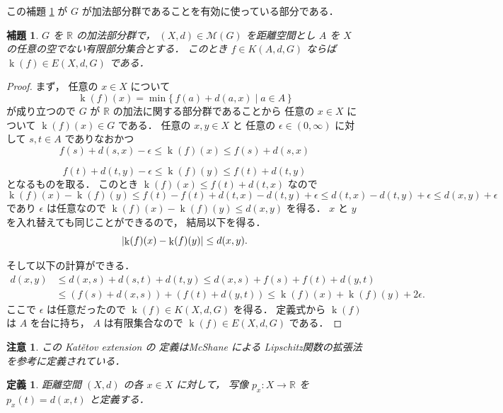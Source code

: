 \documentclass[leqno, 12pt]{jsarticle}
\newtheorem{lem}[thm]{補題}
\newtheorem{df}[thm]{定義}
\newtheorem*{rmk}{注意}
\newcommand{\rr}{\mathbb{R}}
\DeclareMathOperator{\kat}{k}
\newcommand{\KatExt}[1]{\kat(#1)}
\DeclarePairedDelimiter{\abs}{\lvert}{\rvert}
\newcommand{\Met}[1]{\mathscr{M}(#1)}
\newcommand{\KatSpace}[3]{K(#1,#2,#3)}
\newcommand{\Espace}[3]{E(#1,#2,#3)}
\newcommand{\kura}[1]{p_{#1}}
\begin{document}
この補題
\ref{lem:katetov:McShane}
が
$G$
が加法部分群であることを有効に使っている部分である．


\begin{lem}\label{lem:katetov:McShane}
$G$
を
$\rr$
の加法部分群で，
$(X, d)\in \Met{G}$
を距離空間とし
$A$
を
$X$
の任意の空でない有限部分集合とする．
このとき
$f\in \KatSpace{A}{d}{G}$
ならば
$\KatExt{f}\in \Espace{X}{d}{G}$
である．
\end{lem}
\begin{proof}
まず，%
任意の
$x\in X$
について
\[
\KatExt{f}(x)=\min\{\, f(a)+d(a, x)\mid a\in A\, \}
\]
が成り立つので
$G$
が
$\rr$
の加法に関する部分群であることから
任意の
$x\in X$
について
$\KatExt{f}(x)\in G$%
である．
任意の
$x, y\in X$%
と
任意の
$\epsilon\in (0, \infty)$
に対して
$s, t\in A$
でありなおかつ
\[
f(s)+d(s, x)-\epsilon  \le \KatExt{f}(x)\le f(s)+d(s, x)
\]

\[
f(t)+d(t, y)-\epsilon \le \KatExt{f}(y)\le f(t)+d(t, y)
\]
となるものを取る．
このとき
$\KatExt{f}(x)\le f(t)+d(t, x)$
なので
\[
\KatExt{f}(x)-\KatExt{f}(y)\le f(t)-f(t)+d(t, x)-d(t, y)+\epsilon\le d(t, x)-d(t, y)+\epsilon
\le d(x, y)+\epsilon
\]
であり%
$\epsilon$%
は任意なので
$\KatExt{f}(x)-\KatExt{f}(y)\le d(x, y)$
を得る．
$x$%
と%
$y$%
を入れ替えても同じことができるので，
結局以下を得る．
\[
\abs{\KatExt{f}(x)-\KatExt{f}(y)}\le d(x, y). 
\]

そして以下の計算ができる．
\begin{align*}
d(x, y)&\le d(x, s)+d(s, t)+d(t, y)\le d(x, s)+ f(s)+f(t) + d(y, t)\\
&\le (f(s)+d(x, s))+(f(t)+d(y, t))\le \KatExt{f}(x)+\KatExt{f}(y) +2\epsilon. 
\end{align*}
ここで
$\epsilon$
は任意だったので
$\KatExt{f}\in \KatSpace{X}{d}{G}$%
を得る．
定義式から
$\KatExt{f}$
は
$A$
を台に持ち，
$A$
は有限集合なので
$\KatExt{f}\in \Espace{X}{d}{G}$
である．
\end{proof}

\begin{rmk}\label{rmk:katetov:mcshane}
この
Kat\v{e}tov extension
の
定義はMcShane
\cite{McShane}による
Lipschitz関数の拡張法を参考に定義されている．
\end{rmk}



\begin{df}\label{df:katetov:pt}
距離空間
$(X, d)$
の各
$x\in X$
に対して，
写像
$\kura{x}\colon X\to \rr$
を
$\kura{x}(t)=d(x, t)$
と定義する．
\end{df}
\end{document}
